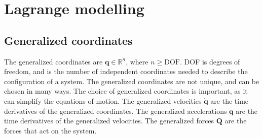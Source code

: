 
\section{Lagrange modelling}
\subsection{Generalized coordinates}
The generalized coordinates are $\mathbf{q} \in \mathbb{R}^n$, where $n \geq \text{DOF}$. DOF is degrees of freedom, and is the number of independent coordinates needed to describe the configuration of a system. The generalized coordinates are not unique, and can be chosen in many ways. The choice of generalized coordinates is important, as it can simplify the equations of motion. The generalized velocities $\dot{\mathbf{q}}$ are the time derivatives of the generalized coordinates. The generalized accelerations $\ddot{\mathbf{q}}$ are the time derivatives of the generalized velocities. The generalized forces $\mathbf{Q}$ are the forces that act on the system.
